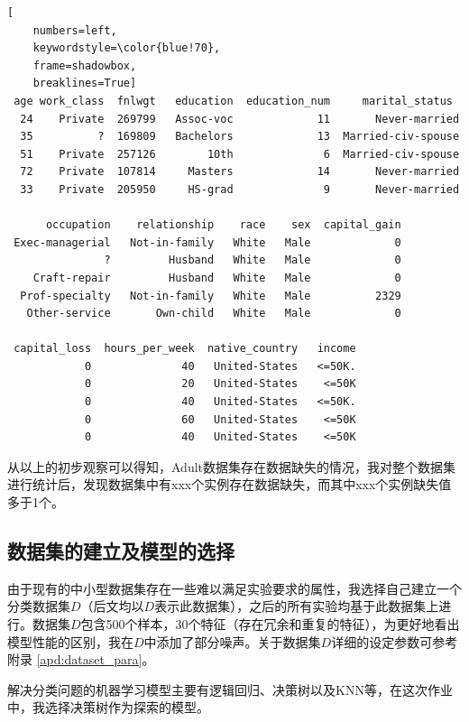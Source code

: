 \documentclass[12pt,a4paper]{article}
\theoremstyle{definition}
\begin{document}
\vspace{0.01\linewidth}
	\begin{lstlisting}[
	numbers=left,
	keywordstyle=\color{blue!70},
	frame=shadowbox,
	breaklines=True]
 age work_class  fnlwgt   education  education_num     marital_status
  24    Private  269799   Assoc-voc             11       Never-married   
  35          ?  169809   Bachelors             13  Married-civ-spouse   
  51    Private  257126        10th              6  Married-civ-spouse   
  72    Private  107814     Masters             14       Never-married   
  33    Private  205950     HS-grad              9       Never-married   

      occupation    relationship    race    sex  capital_gain
 Exec-managerial   Not-in-family   White   Male             0   
               ?         Husband   White   Male             0   
    Craft-repair         Husband   White   Male             0   
  Prof-specialty   Not-in-family   White   Male          2329   
   Other-service       Own-child   White   Male             0   

 capital_loss  hours_per_week  native_country   income  
            0              40   United-States   <=50K.  
            0              20   United-States    <=50K
            0              40   United-States   <=50K.  
            0              60   United-States    <=50K  
            0              40   United-States    <=50K   
	\end{lstlisting}
	
\vspace{0.01\linewidth}
从以上的初步观察可以得知，Adult数据集存在数据缺失的情况，我对整个数据集进行统计后，发现数据集中有xxx个实例存在数据缺失，而其中xxx个实例缺失值多于1个。

\subsection{数据集的建立及模型的选择}

由于现有的中小型数据集存在一些难以满足实验要求的属性，我选择自己建立一个分类数据集$D$（后文均以$D$表示此数据集），之后的所有实验均基于此数据集上进行。数据集$D$包含500个样本，30个特征（存在冗余和重复的特征），为更好地看出模型性能的区别，我在$D$中添加了部分噪声。关于数据集$D$详细的设定参数可参考附录 \ref{apd:dataset_para}。

\vspace{0.015\linewidth}
解决分类问题的机器学习模型主要有逻辑回归、决策树以及KNN等，在这次作业中，我选择决策树作为探索的模型。
\end{document}
